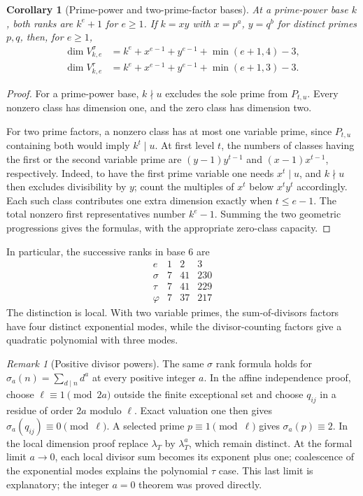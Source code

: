 \documentclass[11pt,a4paper]{article}
\newtheorem{corollary}[theorem]{Corollary}
\theoremstyle{definition}\newtheorem{definition}[theorem]{Definition}
\theoremstyle{remark}\newtheorem*{remark}{Remark}
\newcommand{\ph}{\varphi}\newcommand{\Span}{\operatorname{span}}\newcommand{\ord}{\operatorname{ord}}
\begin{document}
\begin{corollary}[Prime-power and two-prime-factor bases]\label{cor:twoprimes}
At a prime-power base $k$, both ranks are $k^e+1$ for $e\ge1$.
If $k=xy$ with $x=p^a$, $y=q^b$ for distinct primes $p,q$, then, for $e\ge1$,
\begin{align*}
 \dim V^\sigma_{k,e}
 &=k^e+x^{e-1}+y^{e-1}+\min(e+1,4)-3,\\
 \dim V^\tau_{k,e}
 &=k^e+x^{e-1}+y^{e-1}+\min(e+1,3)-3.
\end{align*}
\end{corollary}
\begin{proof}
For a prime-power base, $k\nmid u$ excludes the sole prime from $P_{t,u}$.
Every nonzero class has dimension one, and the zero class has dimension two.

For two prime factors, a nonzero class has at most one variable prime, since
$P_{t,u}$ containing both would imply $k^t\mid u$. At first level $t$, the
numbers of classes having the first or the second variable prime are
$(y-1)y^{t-1}$ and $(x-1)x^{t-1}$, respectively. Indeed, to have the first
prime variable one needs $x^t\mid u$, and $k\nmid u$ then excludes divisibility
by $y$; count the multiples of $x^t$ below $x^ty^t$ accordingly. Each such
class contributes one extra dimension exactly when $t\le e-1$.
The total nonzero first representatives number $k^e-1$. Summing the two
geometric progressions gives the formulas, with the appropriate zero-class
capacity.
\end{proof}

In particular, the successive ranks in base $6$ are
\[
\begin{array}{c|rrr}
 e&1&2&3\\\hline
 \sigma&7&41&230\\
 \tau&7&41&229\\
 \ph&7&37&217
\end{array}
\]
The distinction is local. With two variable primes, the sum-of-divisors
factors have four distinct exponential modes, while the divisor-counting
factors give a quadratic polynomial with three modes.

\begin{remark}[Positive divisor powers]
The same $\sigma$ rank formula holds for $\sigma_a(n)=\sum_{d\mid n}d^a$ at
every positive integer $a$. In the affine independence proof, choose
$\ell\equiv1\pmod{2a}$ outside the finite exceptional set and choose
$q_{ij}$ in a residue of order $2a$ modulo $\ell$. Exact valuation one then
gives $\sigma_a(q_{ij})\equiv0\pmod\ell$. A selected prime
$p\equiv1\pmod\ell$ gives $\sigma_a(p)\equiv2$. In the local dimension
proof replace $\lambda_T$ by $\lambda_T^a$, which remain distinct. At the
formal limit $a\to0$, each local divisor sum becomes its exponent plus one;
coalescence of the exponential modes explains the polynomial $\tau$ case.
This last limit is explanatory; the integer $a=0$ theorem was proved directly.
\end{remark}
\end{document}
